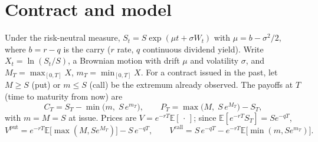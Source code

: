 \documentclass[11pt,a4paper]{article}
\theoremstyle{remark}
\newcommand{\E}{\mathbb{E}}
\begin{document}
\section{Contract and model}
Under the risk-neutral measure, $S_t=S\exp(\mu t+\sigma W_t)$ with $\mu=b-\sigma^2/2$, where $b=r-q$ is the carry ($r$ rate, $q$
continuous dividend yield). Write $X_t=\ln(S_t/S)$, a Brownian motion with drift $\mu$ and volatility $\sigma$, and
$M_T=\max_{[0,T]}X$, $m_T=\min_{[0,T]}X$. For a contract issued in the past, let $M\ge S$ (put) or $m\le S$ (call) be the
extremum already observed. The payoffs at $T$ (time to maturity from now) are
\begin{equation}
  C_T=S_T-\min\big(m,\;S\,e^{m_T}\big),\qquad P_T=\max\big(M,\;S\,e^{M_T}\big)-S_T,
\end{equation}
with $m=M=S$ at issue. Prices are $V=e^{-rT}\E[\,\cdot\,]$; since $\E[e^{-rT}S_T]=Se^{-qT}$,
\begin{equation}\label{eq:decomp}
  V^{\mathrm{put}}=e^{-rT}\E\big[\max(M,Se^{M_T})\big]-S\,e^{-qT},\qquad V^{\mathrm{call}}=S\,e^{-qT}-e^{-rT}\E\big[\min(m,Se^{m_T})\big].
\end{equation}

\end{document}
